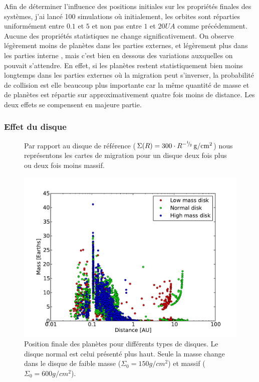 Afin de déterminer l'influence des positions initiales sur les propriétés finales des systèmes, j'ai lancé 100 simulations où initialement, les orbites sont réparties uniformément entre $0.1$ et $5$ et non pas entre $1$ et $20\unit{UA}$ comme précédemment. Aucune des propriétés statistiques ne change significativement. On observe légèrement moins de planètes dans les parties externes, et légèrement plus dans les parties interne , mais c'est bien en dessous des variations auxquelles on pouvait s'attendre. En effet, si les planètes restent statistiquement bien moins longtemps dans les parties externes où la migration peut s'inverser, la probabilité de collision est elle beaucoup plus importante car la même quantité de masse et de planètes est répartie sur approximativement quatre fois moins de distance. Les deux effets se compensent en majeure partie. 

\subsubsection{Effet du disque}
\begin{figure}[htbp]
\centering
{}\hfill
{}

\caption{Par rapport au disque de référence ($\Sigma(R) = 300 \cdot
R^{-{{}^{1\!\!}/ _{\!2}}}\mathrm{\thinspace g/cm^2}$) nous représentons les cartes de migration pour un disque deux fois plus ou deux fois moins
massif. }
\end{figure}

\begin{figure}[htbp]
\centering
\includegraphics[width=0.8\linewidth]{figure/HSE/HSE_disk_effect.pdf}
\caption{Position finale des planètes pour différents types de disques. Le disque normal est celui présenté plus haut. Seule la masse change dans le disque de faible masse ($\Sigma_0=150\unit{g/cm^2}$) et massif ($\Sigma_0=600\unit{g/cm^2}$).}\label{fig:HSE_disk_effect}
\end{figure}

